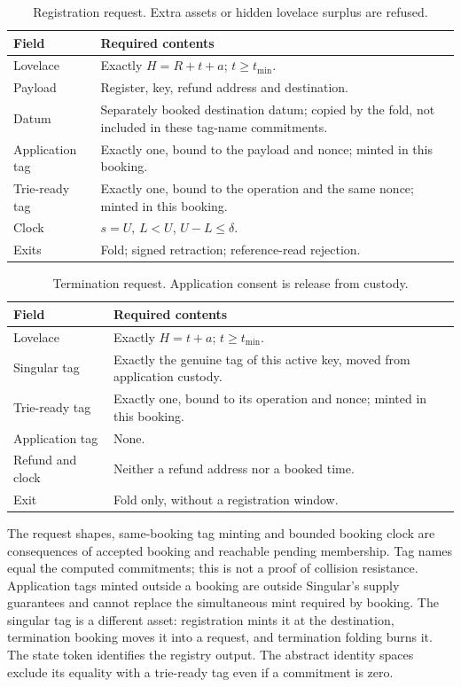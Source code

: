 \begin{table}[ht]
\caption{Registration request. Extra assets or hidden lovelace surplus are refused.}
\centering\small
\begin{tabular}{p{.25\linewidth}p{.65\linewidth}}\toprule
Field & Required contents\\\midrule
Lovelace & Exactly $H=R+t+a$; $t\ge t_{\min}$.\\
Payload & Register, key, refund address and destination.\\
Datum & Separately booked destination datum; copied by the fold, not included in these tag-name commitments.\\
Application tag & Exactly one, bound to the payload and nonce; minted in this booking.\\
Trie-ready tag & Exactly one, bound to the operation and the same nonce; minted in this booking.\\
Clock & $s=U$, $L<U$, $U-L\le\delta$.\\
Exits & Fold; signed retraction; reference-read rejection.\\\bottomrule
\end{tabular}
\end{table}
\begin{table}[ht]
\caption{Termination request. Application consent is release from custody.}
\centering\small
\begin{tabular}{p{.25\linewidth}p{.65\linewidth}}\toprule
Field & Required contents\\\midrule
Lovelace & Exactly $H=t+a$; $t\ge t_{\min}$.\\
Singular tag & Exactly the genuine tag of this active key, moved from application custody.\\
Trie-ready tag & Exactly one, bound to its operation and nonce; minted in this booking.\\
Application tag & None.\\
Refund and clock & Neither a refund address nor a booked time.\\
Exit & Fold only, without a registration window.\\\bottomrule
\end{tabular}
\end{table}

\checked The request shapes, same-booking tag minting and bounded booking clock
are consequences of accepted booking and reachable pending membership.
Tag names equal the computed commitments; this is not a proof of collision
resistance. Application tags minted outside a booking are outside Singular's
supply guarantees and cannot replace the simultaneous mint required by booking.
The singular tag is a different asset: registration mints it at the destination,
termination booking moves it into a request, and termination folding burns it.
The state token identifies the registry output. The abstract identity spaces
exclude its equality with a trie-ready tag even if a commitment is zero.

